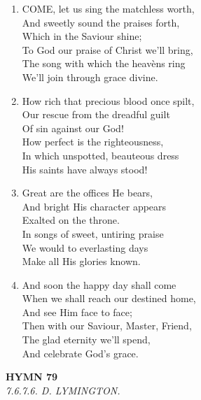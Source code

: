 \begin{enumerate}
    \item COME, let us sing the matchless worth, \\
        And sweetly sound the praises forth, \\
        Which in the Saviour shine; \\
        To God our praise of Christ we'll bring, \\
        The song with which the heav\`ens ring \\
        We'll join through grace divine.

    \item How rich that precious blood once spilt, \\
        Our rescue from the dreadful guilt \\
        Of sin against our God! \\
        How perfect is the righteousness, \\
        In which unspotted, beauteous dress \\
        His saints have always stood!

    \item Great are the offices He bears, \\
        And bright His character appears \\
        Exalted on the throne. \\
        In songs of sweet, untiring praise \\
        We would to everlasting days \\
        Make all His glories known.

    \item And soon the happy day shall come \\
        When we shall reach our destined home, \\
        And see Him face to face; \\
        Then with our Saviour, Master, Friend, \\
        The glad eternity we'll spend, \\
        And celebrate God's grace.

\end{enumerate}

\newpage
\begin{center}
    {\Large \textbf{HYMN 79}}
    \\
    \textit{7.6.7.6. D. LYMINGTON.}
\end{center}
\vspace{1em}

